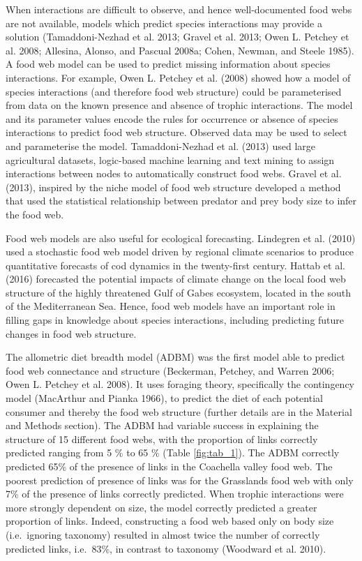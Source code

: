 \documentclass{article}
\begin{document}
When interactions are difficult to observe, and hence well-documented
food webs are not available, models which predict species interactions
may provide a solution (Tamaddoni-Nezhad et al. 2013; Gravel et al.
2013; Owen L. Petchey et al. 2008; Allesina, Alonso, and Pascual 2008a;
Cohen, Newman, and Steele 1985). A food web model can be used to predict
missing information about species interactions. For example, Owen L.
Petchey et al. (2008) showed how a model of species interactions (and
therefore food web structure) could be parameterised from data on the
known presence and absence of trophic interactions. The model and its
parameter values encode the rules for occurrence or absence of species
interactions to predict food web structure. Observed data may be used to
select and parameterise the model. Tamaddoni-Nezhad et al. (2013) used
large agricultural datasets, logic-based machine learning and text
mining to assign interactions between nodes to automatically construct
food webs. Gravel et al. (2013), inspired by the niche model of food web
structure developed a method that used the statistical relationship
between predator and prey body size to infer the food web.

Food web models are also useful for ecological forecasting. Lindegren et
al. (2010) used a stochastic food web model driven by regional climate
scenarios to produce quantitative forecasts of cod dynamics in the
twenty-first century. Hattab et al. (2016) forecasted the potential
impacts of climate change on the local food web structure of the highly
threatened Gulf of Gabes ecosystem, located in the south of the
Mediterranean Sea. Hence, food web models have an important role in
filling gaps in knowledge about species interactions, including
predicting future changes in food web structure.

The allometric diet breadth model (ADBM) was the first model able to
predict food web connectance and structure (Beckerman, Petchey, and
Warren 2006; Owen L. Petchey et al. 2008). It uses foraging theory,
specifically the contingency model (MacArthur and Pianka 1966), to
predict the diet of each potential consumer and thereby the food web
structure (further details are in the Material and Methods section). The
ADBM had variable success in explaining the structure of 15 different
food webs, with the proportion of links correctly predicted ranging from
5 \% to 65 \% (Table \ref{fig:tab_1}). The ADBM correctly predicted 65\%
of the presence of links in the Coachella valley food web. The poorest
prediction of presence of links was for the Grasslands food web with
only 7\% of the presence of links correctly predicted. When trophic
interactions were more strongly dependent on size, the model correctly
predicted a greater proportion of links. Indeed, constructing a food web
based only on body size (i.e.~ignoring taxonomy) resulted in almost
twice the number of correctly predicted links, i.e.~83\%, in contrast to
taxonomy (Woodward et al. 2010).
\end{document}

